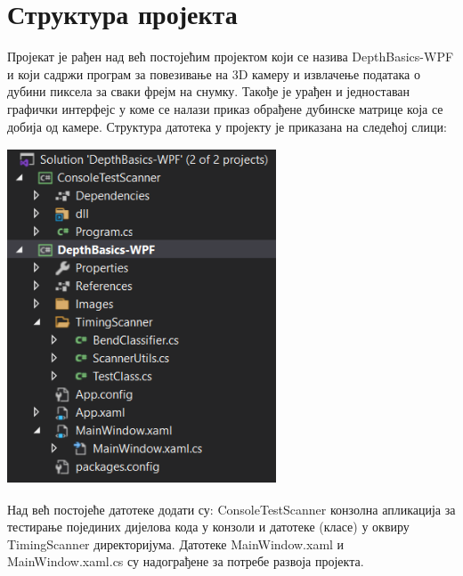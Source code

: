 \documentclass[12pt]{article}
\begin{document}
\newpage
\section{Структура пројекта}
Пројекат је рађен над већ постојећим пројектом који се назива DepthBasics-WPF и који садржи програм за повезивање на 3D камеру и извлачење података о дубини пиксела за сваки фрејм на снумку. Такође је урађен и једноставан графички интерфејс у коме се налази приказ обрађене дубинске матрице која се добија од камере. Структура датотека у пројекту је приказана на следећој слици:
\vspace{0.5cm}
\begin{center}
    \centering 
    \includegraphics[height=10cm, width=8cm]{images/struktura.png}
\end{center}
\vspace{0.5cm}
Над већ постојеће датотеке додати су: ConsoleTestScanner конзолна апликација за тестирање појединих дијелова кода у конзоли и датотеке (класе) у оквиру TimingScanner директоријума. Датотеке MainWindow.xaml и MainWindow.xaml.cs су надограђене за потребе развоја пројекта.

\newpage
\end{document}
